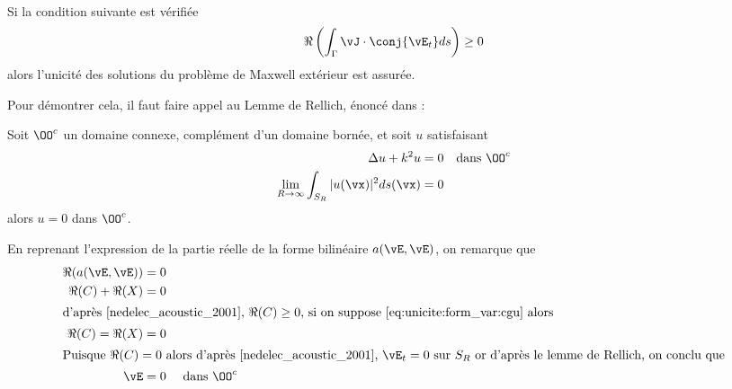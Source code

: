 


  \begin{prop}~\\
    Si la condition suivante est vérifiée
    \begin{equation}\label{eq:unicite:form_var:cgu}
      \Re\left(\int_\Gamma \vJ \cdot \conj{\vE_t} ds\right) \ge 0
    \end{equation}
    alors l'unicité des solutions du problème de Maxwell extérieur est assurée.
  \end{prop}

  Pour démontrer cela, il faut faire appel au Lemme de Rellich, énoncé dans \cite[p.~74]{cessenat_mathematical_1996}:
  \begin{lemme}[Rellich]
    Soit \(\OO^c\) un domaine connexe, complément d'un domaine bornée, et soit \(u\) satisfaisant
    \begin{subequations}
      \begin{align}
        \Delta u + k^2 u = 0 & &\text{dans \(\OO^c\)}
        \\
        \lim_{R\rightarrow\infty}\int_{S_R} |u(\vx)|^2 ds(\vx) = 0
      \end{align}
    \end{subequations}
    alors \(u=0\) dans \(\OO^c\).
  \end{lemme}

  En reprenant l'expression de la partie réelle de la forme bilinéaire \(a(\vE,\vE)\), on remarque que
  \begin{align}
    \Re(a(\vE,\vE)) & = 0
    \\
    \Re(C) + \Re(X) & = 0
    \\ \intertext{d'après \cite[eq.~5.3.89]{nedelec_acoustic_2001}, \(\Re(C)\ge 0\), si on suppose \eqref{eq:unicite:form_var:cgu} alors } 
    \Re(C) = \Re(X) & = 0
    \\ \intertext{Puisque \(\Re(C) = 0\) alors d'après \cite[Théorème~5.3.5]{nedelec_acoustic_2001}, \(\vE_t = 0\) sur \(S_R\) or d'après le lemme de Rellich, on conclu que}
    \vE &= 0  &\text{ dans } \OO^c
  \end{align}

